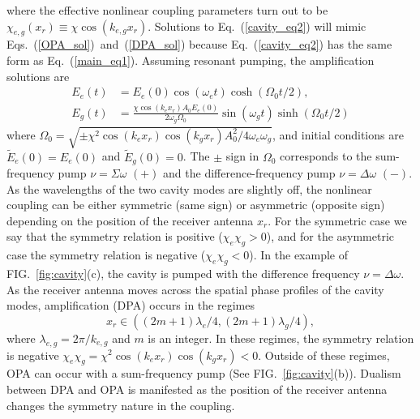 \documentclass[aps,prl,nobibnotes,nofootinbib,showpacs,reprint]{revtex4-1}
\newcommand{\Fig}[1]{FIG.~\ref{#1}}
\newcommand{\Eq}[1]{Eq.~(\ref{#1})}
\newcommand{\Eqs}[2]{Eqs.~(\ref{#1})~and~(\ref{#2})}
\newcommand{\we}{\omega_{e}}
\newcommand{\wg}{\omega_{g}}
\newcommand{\chie}{\chi_{e}}
\newcommand{\chig}{\chi_{g}}
\newcommand{\Dw}{\Delta \omega}
\newcommand{\Sw}{\Sigma \omega}
\begin{document}
where the effective nonlinear coupling parameters turn out to be $\chi_{e,g}(x_{r}) \equiv \chi\cos{(k_{e,g}x_{r})}$. Solutions to \Eq{cavity_eq2} will mimic \Eqs{OPA_sol}{DPA_sol} because \Eq{cavity_eq2} has the same form as \Eq{main_eq1}. Assuming resonant pumping, the amplification solutions are 
\begin{equation}
	\begin{split}
	E_{e}(t) &= E_{e}(0)\cos{(\we t)}\cosh{(\Omega_{0} t/2)},		\\
	E_{g}(t) &= \frac{\chi \cos{(k_{e} x_{r})}A_{0}E_{e}(0)}{2\wg\Omega_{0}}\sin{(\wg t)}\sinh{(\Omega_{0}t/2)}
	\end{split}
\end{equation}
where $\Omega_{0} = \sqrt{ \pm\chi^2\cos{(k_{e}x_{r})}\cos{(k_{g}x_{r})}A^2_{0}/4\we\wg }$, and initial conditions are $\tilde{E}_{e}(0) = E_{e}(0)$ and $\tilde{E}_{g}(0) = 0$. The $\pm$ sign in $\Omega_{0}$ corresponds to the sum-frequency pump $\nu = \Sw$ $(+)$ and the difference-frequency pump $\nu = \Dw$ $(-)$. As the wavelengths of the two cavity modes are slightly off, the nonlinear coupling can be either symmetric (same sign) or asymmetric (opposite sign) depending on the position of the receiver antenna $x_{r}$. For the symmetric case we say that the symmetry relation is positive ($\chie\chig > 0$), and for the asymmetric case the symmetry relation is negative ($\chie\chig < 0$). In the example of \Fig{fig:cavity}(c), the cavity is pumped with the difference frequency $\nu = \Dw$. As the receiver antenna moves across the spatial phase profiles of the cavity modes, amplification (DPA) occurs in the regimes 
\begin{equation}\label{DPA_regime}
	x_{r} \in \left( (2m+1)\lambda_{e}/4, (2m+1)\lambda_{g}/4 \right)	,
\end{equation}
where $\lambda_{e,g} = 2\pi/k_{e,g}$ and $m$ is an integer. In these regimes, the symmetry relation is negative $\chie\chig = \chi^2\cos{(k_{e}x_{r})}\cos{(k_{g}x_{r})}< 0$. Outside of these regimes, OPA can occur with a sum-frequency pump (See \Fig{fig:cavity}(b)). Dualism between DPA and OPA is manifested as the position of the receiver antenna changes the symmetry nature in the coupling. 
\end{document}
